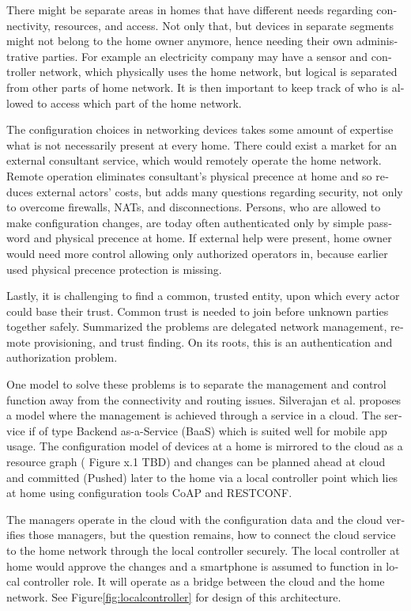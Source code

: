 \documentclass[12pt,a4paper,english]{tutthesis}
\begin{document}
\begin{otherlanguage}{english}
There might be separate areas in homes that have different needs regarding
connectivity, resources, and access. Not only that, but devices in
separate segments might not belong to the home owner anymore, hence needing
their own administrative parties. For example an electricity company may
have a sensor and controller network, which physically uses the home network, but
logical is separated from other parts of home network. It is then
important to keep track of who is allowed to access which part of the
home network. 


The configuration choices in networking devices takes some
amount of expertise what is not necessarily present at every
home. There could exist a market for an external consultant service, which would
remotely operate the home network.
Remote operation eliminates consultant's 
physical precence at home and so reduces external actors' costs, but adds many questions
regarding security, not only to overcome firewalls, NATs, and disconnections.
Persons, who are allowed to make configuration changes, are today
often authenticated only by simple password and physical precence at home.
If external help were present, home owner would need more 
control allowing only authorized operators in, because earlier used
physical precence protection is missing.

Lastly, it is challenging to find a common, 
trusted entity, upon which every actor could base their trust.
Common trust is needed to join before unknown parties together
safely. 
Summarized the problems are delegated network management, remote
provisioning, and trust finding. On its roots, this is an authentication
and authorization problem.










One model to solve these problems is to separate the management and
control function away from the connectivity and routing
issues. Silverajan et al.\cite{silverajan2015collaborative} proposes
a model where the management is achieved through a service in a cloud.
The service if of type Backend as-a-Service (BaaS) which is suited
well for mobile app usage. The
configuration model of devices at a home is mirrored to the cloud as a
resource graph ( Figure x.1 TBD) and changes can be planned ahead at cloud
and committed (Pushed) later to the home via a local controller point
which lies at home using configuration tools CoAP and RESTCONF.

The managers operate in the cloud with the configuration data and the
cloud verifies those managers,
but the question remains, how to connect the cloud service to the home network
through the local controller securely. The local controller at home
would approve the changes and a smartphone is assumed to function in
local controller role. It will operate as a bridge between the cloud and the home network.
See Figure\ref{fig:localcontroller} for design of this architecture.


\end{otherlanguage}
\end{document}
